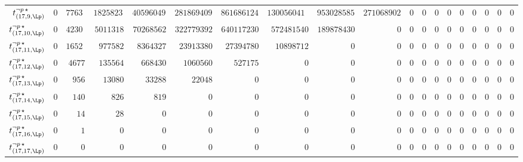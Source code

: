 \begin{tabular}{r|rrrrrrrrrrrrrrrrrr}
  $t^{\neg p \, \star}_{(17,9,\Lp)}$ & $0$ & $77631$ & $18258230$ & $405960492$ & $2818694096$ & $8616861245$ & $13005604110$ & $9530285856$ & $2710689024$ & $0$ & $0$ & $0$ & $0$ & $0$ & $0$ & $0$ & $0$ & $0$ \\
  $t^{\neg p \, \star}_{(17,10,\Lp)}$ & $0$ & $42307$ & $5011318$ & $70268562$ & $322779392$ & $640117230$ & $572481540$ & $189878430$ & $0$ & $0$ & $0$ & $0$ & $0$ & $0$ & $0$ & $0$ & $0$ & $0$ \\
  $t^{\neg p \, \star}_{(17,11,\Lp)}$ & $0$ & $16523$ & $977582$ & $8364327$ & $23913380$ & $27394780$ & $10898712$ & $0$ & $0$ & $0$ & $0$ & $0$ & $0$ & $0$ & $0$ & $0$ & $0$ & $0$ \\
  $t^{\neg p \, \star}_{(17,12,\Lp)}$ & $0$ & $4677$ & $135564$ & $668430$ & $1060560$ & $527175$ & $0$ & $0$ & $0$ & $0$ & $0$ & $0$ & $0$ & $0$ & $0$ & $0$ & $0$ & $0$ \\
  $t^{\neg p \, \star}_{(17,13,\Lp)}$ & $0$ & $956$ & $13080$ & $33288$ & $22048$ & $0$ & $0$ & $0$ & $0$ & $0$ & $0$ & $0$ & $0$ & $0$ & $0$ & $0$ & $0$ & $0$ \\
  $t^{\neg p \, \star}_{(17,14,\Lp)}$ & $0$ & $140$ & $826$ & $819$ & $0$ & $0$ & $0$ & $0$ & $0$ & $0$ & $0$ & $0$ & $0$ & $0$ & $0$ & $0$ & $0$ & $0$ \\
  $t^{\neg p \, \star}_{(17,15,\Lp)}$ & $0$ & $14$ & $28$ & $0$ & $0$ & $0$ & $0$ & $0$ & $0$ & $0$ & $0$ & $0$ & $0$ & $0$ & $0$ & $0$ & $0$ & $0$ \\
  $t^{\neg p \, \star}_{(17,16,\Lp)}$ & $0$ & $1$ & $0$ & $0$ & $0$ & $0$ & $0$ & $0$ & $0$ & $0$ & $0$ & $0$ & $0$ & $0$ & $0$ & $0$ & $0$ & $0$ \\
  $t^{\neg p \, \star}_{(17,17,\Lp)}$ & $0$ & $0$ & $0$ & $0$ & $0$ & $0$ & $0$ & $0$ & $0$ & $0$ & $0$ & $0$ & $0$ & $0$ & $0$ & $0$ & $0$ & $0$ \\
\end{tabular}
